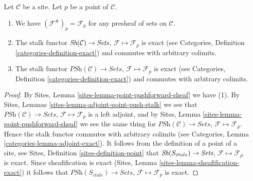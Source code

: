 \begin{lemma}
\label{lemma-stalk-exact}
Let $\mathcal{C}$ be a site.
Let $p$ be a point of $\mathcal{C}$.
\begin{enumerate}
\item We have $(\mathcal{F}^\#)_p = \mathcal{F}_p$
for any presheaf of sets on $\mathcal{C}$.
\item The stalk functor
$\mathop{\textit{Sh}}\nolimits(\mathcal{C}) \to \textit{Sets}$,
$\mathcal{F} \mapsto \mathcal{F}_p$ is exact (see
Categories, Definition \ref{categories-definition-exact})
and commutes with arbitrary colimits.
\item The stalk functor
$\textit{PSh}(\mathcal{C}) \to \textit{Sets}$,
$\mathcal{F} \mapsto \mathcal{F}_p$ is exact (see
Categories, Definition \ref{categories-definition-exact})
and commutes with arbitrary colimits.
\end{enumerate}
\end{lemma}

\begin{proof}
By
Sites, Lemma \ref{sites-lemma-point-pushforward-sheaf}
we have (1).
By
Sites, Lemmas \ref{sites-lemma-adjoint-point-push-stalk}
we see that
$\textit{PSh}(\mathcal{C}) \to \textit{Sets}$,
$\mathcal{F} \mapsto \mathcal{F}_p$ is a left adjoint,
and by
Sites, Lemma \ref{sites-lemma-point-pushforward-sheaf}
we see the same thing for
$\textit{PSh}(\mathcal{C}) \to \textit{Sets}$,
$\mathcal{F} \mapsto \mathcal{F}_p$.
Hence the stalk functor commutes with arbitrary colimits (see
Categories, Lemma \ref{categories-lemma-adjoint-exact}).
It follows from the definition of a point of a site, see
Sites, Definition \ref{sites-definition-point}
that $\mathop{\textit{Sh}}\nolimits(S_{\acute{e}tale}) \to \textit{Sets}$,
$\mathcal{F} \mapsto \mathcal{F}_p$
is exact. Since sheafification is exact
(Sites, Lemma \ref{sites-lemma-sheafification-exact})
it follows that $\textit{PSh}(S_{\acute{e}tale}) \to \textit{Sets}$,
$\mathcal{F} \mapsto \mathcal{F}_p$
is exact.
\end{proof}

